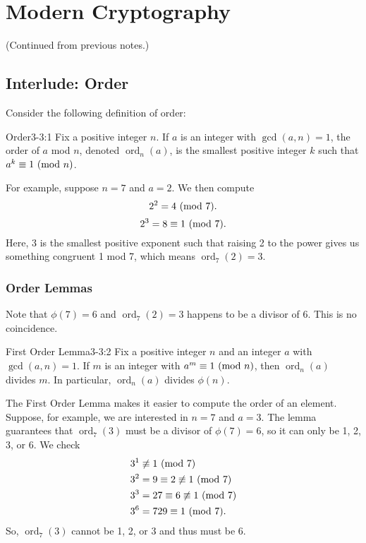 \documentclass[letterpaper]{article}
\DeclareMathOperator{\ord}{ord}
\begin{document}
\section{Modern Cryptography}
(Continued from previous notes.)

\subsection{Interlude: Order}
Consider the following definition of order: 
\begin{definition}{Order}{3-3:1}
    Fix a positive integer $n$. If $a$ is an integer with $\gcd(a, n) = 1$, the order of $a$ mod $n$, denoted $\ord_{n}(a)$, is the smallest positive integer $k$ such that $a^k \equiv 1 \ (\mathrm{mod}\ n)$.
\end{definition}
For example, suppose $n = 7$ and $a = 2$. We then compute 
\[2^2 = 4 \ (\mathrm{mod}\ 7).\]
\[2^3 = 8 \equiv 1 \ (\mathrm{mod}\ 7).\]
Here, 3 is the smallest positive exponent such that raising 2 to the power gives us something congruent 1 mod 7, which means $\ord_{7}(2) = 3$.

\subsubsection{Order Lemmas}
Note that $\phi(7) = 6$ and $\ord_{7}(2) = 3$ happens to be a divisor of 6. This is no coincidence. 

\begin{lemma}{First Order Lemma}{3-3:2}
    Fix a positive integer $n$ and an integer $a$ with $\gcd(a, n) = 1$. If $m$ is an integer with $a^m \equiv 1 \ (\mathrm{mod}\ n)$, then $\ord_{n}(a)$ divides $m$. In particular, $\ord_{n}(a)$ divides $\phi(n)$. 
\end{lemma}
The First Order Lemma makes it easier to compute the order of an element. Suppose, for example, we are interested in $n = 7$ and $a = 3$. The lemma guarantees that $\ord_{7}(3)$ must be a divisor of $\phi(7) = 6$, so it can only be 1, 2, 3, or 6. We check
\begin{equation*}
    \begin{aligned}
        &3^1 \not\equiv 1 \ (\mathrm{mod}\ 7) \\ 
        &3^2 = 9 \equiv 2 \not\equiv 1 \ (\mathrm{mod}\ 7) \\ 
        &3^3 = 27 \equiv 6 \not\equiv 1 \ (\mathrm{mod}\ 7) \\ 
        &3^6 = 729 \equiv 1 \ (\mathrm{mod}\ 7).
    \end{aligned}
\end{equation*}
So, $\ord_{7}(3)$ cannot be 1, 2, or 3 and thus must be 6.
\end{document}
